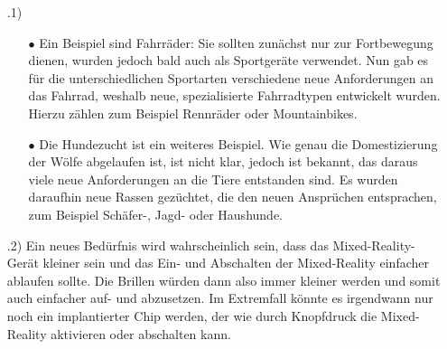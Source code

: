 \documentclass[12pt]{scrartcl}
\begin{document}
\exercise{}
\begin{itemize}
    \item[\theenumi.1)] \begin{itemize}
                            \item[$\bullet$] Ein Beispiel sind Fahrräder: Sie sollten zunächst nur zur Fortbewegung dienen, wurden jedoch bald auch als Sportgeräte verwendet. 
                                             Nun gab es für die unterschiedlichen Sportarten verschiedene neue Anforderungen an das Fahrrad, weshalb neue, spezialisierte Fahrradtypen entwickelt wurden. 
                                             Hierzu zählen zum Beispiel Rennräder oder Mountainbikes.
                            \item[$\bullet$] Die Hundezucht ist ein weiteres Beispiel. Wie genau die Domestizierung der Wölfe abgelaufen ist, ist nicht klar, jedoch ist bekannt,
                                             das daraus viele neue Anforderungen an die Tiere entstanden sind. Es wurden daraufhin neue Rassen gezüchtet, die den neuen Ansprüchen entsprachen,
                                             zum Beispiel Schäfer-, Jagd- oder Haushunde.
                        \end{itemize}
    \item[\theenumi.2)] Ein neues Bedürfnis wird wahrscheinlich sein, dass das Mixed-Reality-Gerät kleiner sein und das Ein- und Abschalten der Mixed-Reality einfacher ablaufen sollte.
                        Die Brillen würden dann also immer kleiner werden und somit auch einfacher auf- und abzusetzen. Im Extremfall könnte es irgendwann nur noch ein implantierter Chip werden, der
                        wie durch Knopfdruck die Mixed-Reality aktivieren oder abschalten kann.
\end{itemize}
\end{document}
